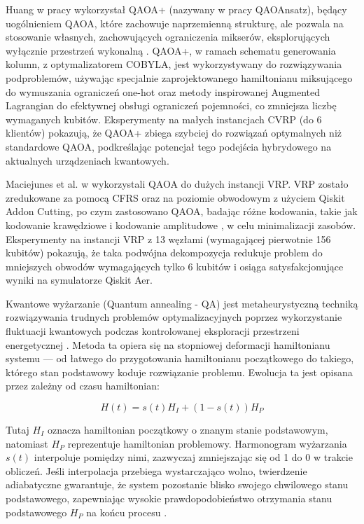 Huang w pracy \cite{huang2025solvingcapacitatedvehiclerouting} wykorzystał QAOA+ (nazywany w pracy QAOAnsatz), będący uogólnieniem QAOA, które zachowuje naprzemienną strukturę, ale pozwala na stosowanie własnych, zachowujących ograniczenia mikserów, eksplorujących wyłącznie przestrzeń wykonalną \cite{Hadfield_2019}. QAOA+, w ramach schematu generowania kolumn, z optymalizatorem COBYLA, jest wykorzystywany do rozwiązywania podproblemów, używając specjalnie zaprojektowanego hamiltonianu miksującego do wymuszania ograniczeń one-hot oraz metody inspirowanej Augmented Lagrangian do efektywnej obsługi ograniczeń pojemności, co zmniejsza liczbę wymaganych kubitów. Eksperymenty na małych instancjach CVRP (do 6 klientów) pokazują, że QAOA+ zbiega szybciej do rozwiązań optymalnych niż standardowe QAOA, podkreślając potencjał tego podejścia hybrydowego na aktualnych urządzeniach kwantowych.

Maciejunes et al. w \cite{maciejunes2025solvinglargescalevehiclerouting} wykorzystali QAOA do dużych instancji VRP. VRP zostało zredukowane za pomocą CFRS oraz na poziomie obwodowym z użyciem Qiskit Addon Cutting, po czym zastosowano QAOA, badając różne kodowania, takie jak kodowanie krawędziowe i kodowanie amplitudowe \cite{amplitude}, w celu minimalizacji zasobów. Eksperymenty na instancji VRP z 13 węzłami (wymagającej pierwotnie 156 kubitów) pokazują, że taka podwójna dekompozycja redukuje problem do mniejszych obwodów wymagających tylko 6 kubitów i osiąga satysfakcjonujące wyniki na symulatorze Qiskit Aer.


Kwantowe wyżarzanie (Quantum annealing - QA) jest metaheurystyczną techniką rozwiązywania trudnych problemów optymalizacyjnych poprzez wykorzystanie fluktuacji kwantowych podczas kontrolowanej eksploracji przestrzeni energetycznej \cite{Kadowaki_1998}. Metoda ta opiera się na stopniowej deformacji hamiltonianu systemu — od łatwego do przygotowania hamiltonianu początkowego do takiego, którego stan podstawowy koduje rozwiązanie problemu. Ewolucja ta jest opisana przez zależny od czasu hamiltonian:

\begin{equation}
H(t) = s(t) H_I + (1 - s(t)) H_P
\end{equation}

Tutaj $H_I$ oznacza hamiltonian początkowy o znanym stanie podstawowym, natomiast $H_P$ reprezentuje hamiltonian problemowy. Harmonogram wyżarzania $s(t)$ interpoluje pomiędzy nimi, zazwyczaj zmniejszając się od 1 do 0 w trakcie obliczeń. Jeśli interpolacja przebiega wystarczająco wolno, twierdzenie adiabatyczne gwarantuje, że system pozostanie blisko swojego chwilowego stanu podstawowego, zapewniając wysokie prawdopodobieństwo otrzymania stanu podstawowego $H_P$ na końcu procesu \cite{mcgeoch2022adiabatic}.

